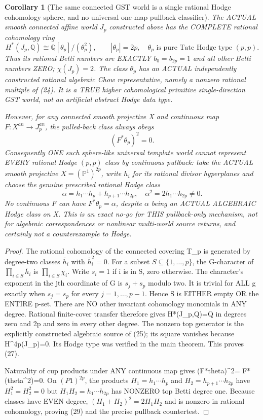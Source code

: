 \documentclass[11pt]{article}
\newtheorem{corollary}{Corollary}
\begin{document}
\begin{corollary}[The same connected GST world is a single rational Hodge cohomology sphere, and no universal one-map pullback classifier]
The ACTUAL smooth connected affine
world $J_p$ constructed above
has the COMPLETE rational
cohomology ring
\[
 \boxed{
 H^*(J_p,\mathbb Q)
 \cong\mathbb Q[\theta_p]/
          (\theta_p^2),\qquad
 |\theta_p|=2p,\quad
 \theta_p\text{ is pure Tate
 Hodge type }(p,p).
 }                                                     \tag{27}
\]
Thus its rational Betti numbers
are EXACTLY
$b_0=b_{2p}=1$ and all
other Betti numbers ZERO;
$\chi(J_p)=2$.
The class $\theta_p$ has an
ACTUAL independently
constructed rational algebraic
Chow representative,
namely a nonzero rational
multiple of (24).
It is a TRUE higher
cohomological primitive
single-direction GST world,
not an artificial abstract
Hodge data type.

However, for any connected
smooth projective X and
continuous map $F:X^{an}\to
J_p^{an}$, the pulled-back
class always obeys
\[
 \boxed{(F^*\theta_p)^2=0.}                    \tag{28}
\]
Consequently ONE such
sphere-like universal template
world cannot represent EVERY
rational Hodge $(p,p)$ class
by continuous pullback:
take the ACTUAL smooth
projective
$X=(\mathbb P^1)^{2p}$,
write $h_i$ for its rational
divisor hyperplanes and choose
the genuine prescribed rational
Hodge class
\[
 \boxed{
 \alpha=h_1\cdots h_p+
              h_{p+1}\cdots h_{2p},
 \quad
 \alpha^2=2h_1\cdots h_{2p}\ne0 .
 }                                                     \tag{29}
\]
No continuous $F$ can have
$F^*\theta_p=\alpha$,
despite $\alpha$ being
an ACTUAL ALGEBRAIC Hodge
class on X. This is an
exact no-go for THIS
pullback-only mechanism,
not for algebraic
correspondences or nonlinear
multi-world source returns,
and certainly not a
counterexample to Hodge.
\end{corollary}
\begin{proof}
The rational cohomology of the
connected covering T_p is
generated by degree-two
classes $\bar h_i$ with
$\bar h_i^2=0$. For a subset
$S\subseteq\{1,\ldots,p\}$,
the G-character of
$\prod_{i\in S}\bar h_i$
is $\prod_{i\in S}\chi_i$.
Write $s_i=1$ if i is
in S, zero otherwise.
The character's exponent
in the jth coordinate of G
is $s_j+s_p$ modulo two.
It is trivial for ALL g
exactly when
$s_j=s_p$ for every
$j=1,\ldots,p-1$.
Hence S is EITHER empty
OR the ENTIRE p-set.
There are NO other
invariant cohomology
monomials in ANY degree.
Rational finite-cover
transfer therefore gives
H*(J_p,Q)=Q in degrees
zero and 2p and zero
in every other degree.
The nonzero top generator
is the explicitly
constructed algebraic
source of (25); its square
vanishes because H^{4p}(J_p)=0.
Its Hodge type was verified
in the main theorem.
This proves (27).

Naturality of cup products
under ANY continuous map
gives (F*theta)^2=
F*(theta^2)=0.
On $(P1)^{2p}$,
the products
$H_1=h_1\cdots h_p$ and
$H_2=h_{p+1}\cdots h_{2p}$
have $H_1^2=H_2^2=0$
but $H_1H_2=h_1\cdots
h_{2p}$ has NONZERO
top Betti degree one.
Because classes have EVEN
degree, $(H_1+H_2)^2=
2H_1H_2$ and is
nonzero in rational
cohomology, proving (29)
and the precise pullback
countertest.
\end{proof}
\end{document}
